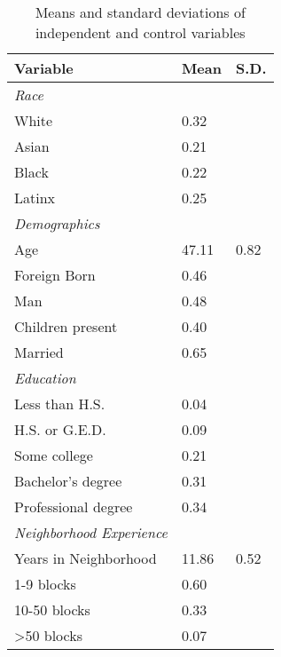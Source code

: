 % 
\begin{table}[ht]
\centering
\caption{Means and standard deviations of independent and control variables} 
\label{tab:descriptives}
\begin{tabular}{lp{.5in}p{.5in}}
  \toprule
Variable & Mean & S.D. \\ 
  \midrule
\emph{Race}&&\\White &  0.32 &  \\ 
  Asian &  0.21 &  \\ 
  Black &  0.22 &  \\ 
  Latinx &  0.25 &  \\ 
  \emph{Demographics}&&\\Age & 47.11 & 0.82 \\ 
  Foreign Born &  0.46 &  \\ 
  Man &  0.48 &  \\ 
  Children present &  0.40 &  \\ 
  Married &  0.65 &  \\ 
  \emph{Education}&&\\Less than H.S. &  0.04 &  \\ 
  H.S. or G.E.D. &  0.09 &  \\ 
  Some college &  0.21 &  \\ 
  Bachelor's degree &  0.31 &  \\ 
  Professional degree &  0.34 &  \\ 
  \emph{Neighborhood Experience}\\Years in Neighborhood & 11.86 & 0.52 \\ 
  1-9 blocks &  0.60 &  \\ 
  10-50 blocks &  0.33 &  \\ 
  >50 blocks &  0.07 &  \\ 
   \bottomrule
\end{tabular}
\end{table}
